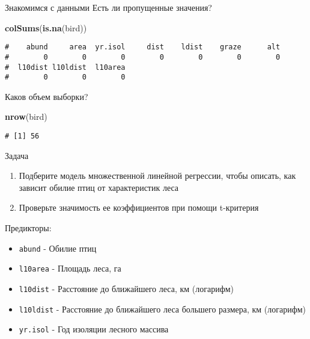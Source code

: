 \documentclass[
  ignorenonframetext,
  t,xcolor=table]{beamer}
\newenvironment{Shaded}{\begin{snugshade}}{\end{snugshade}}
\newcommand{\FunctionTok}[1]{\textcolor[rgb]{0.13,0.29,0.53}{\textbf{#1}}}
\newcommand{\NormalTok}[1]{#1}
\providecommand{\tightlist}{%
  \setlength{\itemsep}{0pt}\setlength{\parskip}{0pt}}
\begin{document}
\begin{frame}[fragile]{Знакомимся с данными}
\protect\hypertarget{ux437ux43dux430ux43aux43eux43cux438ux43cux441ux44f-ux441-ux434ux430ux43dux43dux44bux43cux438}{}
Есть ли пропущенные значения?

\begin{Shaded}
\begin{Highlighting}[]
\FunctionTok{colSums}\NormalTok{(}\FunctionTok{is.na}\NormalTok{(bird))}
\end{Highlighting}
\end{Shaded}

\begin{verbatim}
#    abund     area  yr.isol     dist    ldist    graze      alt 
#        0        0        0        0        0        0        0 
#  l10dist l10ldist  l10area 
#        0        0        0
\end{verbatim}

Каков объем выборки?

\begin{Shaded}
\begin{Highlighting}[]
\FunctionTok{nrow}\NormalTok{(bird)}
\end{Highlighting}
\end{Shaded}

\begin{verbatim}
# [1] 56
\end{verbatim}
\end{frame}

\begin{frame}[fragile]{Задача}
\protect\hypertarget{ux437ux430ux434ux430ux447ux430}{}
\begin{enumerate}
\tightlist
\item
  Подберите модель множественной линейной регрессии, чтобы описать, как
  зависит обилие птиц от характеристик леса
\item
  Проверьте значимость ее коэффициентов при помощи t-критерия
\end{enumerate}

\vfill

Предикторы:

\begin{itemize}
\tightlist
\item
  \texttt{abund} - Обилие птиц
\item
  \texttt{l10area} - Площадь леса, га
\item
  \texttt{l10dist} - Расстояние до ближайшего леса, км (логарифм)
\item
  \texttt{l10ldist} - Расстояние до ближайшего леса большего размера, км
  (логарифм)
\item
  \texttt{yr.isol} - Год изоляции лесного массива
\end{itemize}
\end{frame}
\end{document}
